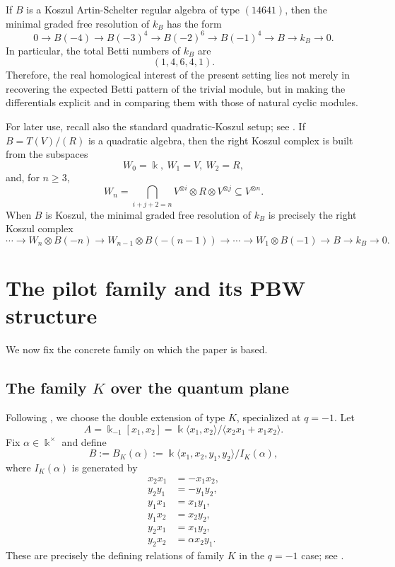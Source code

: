 \documentclass[reqno]{amsart}
\numberwithin{equation}{section}
\theoremstyle{definition}
\begin{document}
If \(B\) is a Koszul Artin-Schelter regular algebra of type \((14641)\), then the minimal graded free resolution of \(k_B\) has the form
\begin{equation}\label{eq:type-14641-resolution}
0\longrightarrow B(-4)\longrightarrow B(-3)^4\longrightarrow B(-2)^6\longrightarrow B(-1)^4\longrightarrow B\longrightarrow k_B\longrightarrow 0.
\end{equation}
In particular, the total Betti numbers of \(k_B\) are
\[
(1,4,6,4,1).
\]
Therefore, the real homological interest of the present setting lies not merely in recovering the expected Betti pattern of the trivial module, but in making the differentials explicit and in comparing them with those of natural cyclic modules.

For later use, recall also the standard quadratic-Koszul setup; see \cite[Chs.~2 and~3]{PP05}. If $B=T(V)/(R)$ is a quadratic algebra, then the right Koszul complex is built from the subspaces
\[
W_0=\Bbbk,\ W_1=V,\ W_2=R,
\]
and, for \(n\geq 3\),
\[
W_n=\bigcap_{i+j+2=n}V^{\otimes i}\otimes R\otimes V^{\otimes j}\subseteq V^{\otimes n}.
\]
When \(B\) is Koszul, the minimal graded free resolution of \(k_B\) is precisely the right Koszul complex
\small{\[
\cdots\longrightarrow W_n\otimes B(-n)\longrightarrow W_{n-1}\otimes B(-(n-1))\longrightarrow \cdots \longrightarrow W_1\otimes B(-1)\longrightarrow B\longrightarrow k_B\longrightarrow 0.
\]}

\section{The pilot family and its PBW structure}

We now fix the concrete family on which the paper is based.

\subsection{The family \texorpdfstring{\(K\)}{Lg} over the quantum plane}

Following \cite[Section~3]{ZZ09}, we choose the double extension of type \(K\), specialized at \(q=-1\). Let
\[
A=\Bbbk_{-1}[x_1,x_2]
=
\Bbbk\langle x_1,x_2\rangle/\langle x_2x_1+x_1x_2\rangle.
\]
Fix \(\alpha\in\Bbbk^\times\) and define
\[
B:=B_K(\alpha):=
\Bbbk\langle x_1,x_2,y_1,y_2\rangle/I_K(\alpha),
\]
where \(I_K(\alpha)\) is generated by
\begin{align}
x_2x_1 &= -x_1x_2,\label{eq:K1}\\
y_2y_1 &= -y_1y_2,\label{eq:K2}\\
y_1x_1 &= x_1y_1,\label{eq:K3}\\
y_1x_2 &= x_2y_2,\label{eq:K4}\\
y_2x_1 &= x_1y_2,\label{eq:K5}\\
y_2x_2 &= \alpha x_2y_1.\label{eq:K6}
\end{align}
These are precisely the defining relations of family \(K\) in the \(q=-1\) case; see \cite[Section~4.6]{HHR25}.
\end{document}
